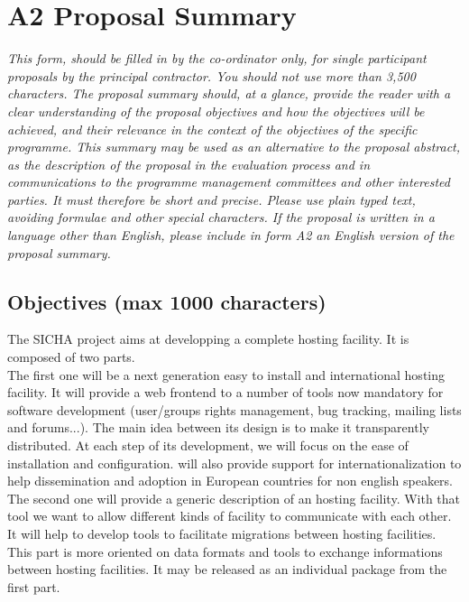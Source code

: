 \documentclass[a4paper,11pt]{report}
\begin{document}
\section*{A2 Proposal Summary}
\textit{This form, should be filled in by the co-ordinator only, for single
participant proposals by the principal contractor. You should not use more than
3,500 characters. The proposal summary should, at a glance, provide the reader
with a clear understanding of the proposal objectives and how the objectives
will be achieved, and their relevance in the context of the objectives of the
specific programme. This summary may be used as an alternative to the proposal
abstract, as the description of the proposal in the evaluation process and in
communications to the programme management committees and other interested
parties. It must therefore be short and precise. Please use plain typed text,
avoiding formulae and other special characters. If the proposal is written in a
language other than English, please include in form A2 an English version of
the proposal summary.} \\
\subsection*{Objectives (max 1000 characters)}
The SICHA project aims at developping a complete hosting facility. It is 
composed of two parts. \\
The first one will be a next generation easy to install and international
hosting facility. It will provide a web frontend to a number of tools now 
mandatory for software development (user/groups rights management, bug tracking, mailing lists and forums...). 
The main idea between its design is to make it transparently distributed.
At each step of its development, we will focus on the ease of installation and configuration.  will also provide support for internationalization to help dissemination and adoption in European countries for non english speakers.\\
The second one will provide a generic description of
an hosting facility. With that tool we want to allow different kinds of facility
to communicate with each other. It will help to develop tools to facilitate
migrations between hosting facilities. This part is more oriented on data formats and tools to exchange informations between hosting facilities. It may
be released as an individual package from the first part.\\
\\ 
\end{document}
